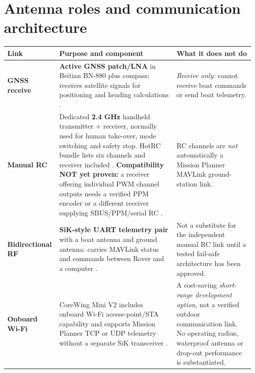 \section{Antenna roles and communication architecture}
\begin{tabularx}{\linewidth}{L{29mm}Y Y}
\toprule \textbf{Link} & \textbf{Purpose and component} & \textbf{What it does not do}\\\midrule
\textbf{GNSS receive} & \textbf{Active GNSS patch/LNA} in Beitian BN-880 plus compass; receives satellite signals for positioning and heading calculations \cite{bnShop,bnMaker,bnData}. & \emph{Receive only:} cannot receive boat commands or send boat telemetry.\\
\textbf{Manual RC} & Dedicated \textbf{2.4 GHz} handheld transmitter + receiver, normally used for human take-over, mode switching and safety stop. HotRC bundle lists six channels and receiver included \cite{hotrcCurrent,rcDoc}. \textbf{Compatibility NOT yet proven:} a receiver offering individual PWM channel outputs needs a verified PPM encoder or a different receiver supplying SBUS/PPM/serial RC \cite{coreDoc,rcPWMEncoder}. & RC channels are \emph{not} automatically a Mission Planner MAVLink ground-station link.\\
\textbf{Bidirectional RF} & \textbf{SiK-style UART telemetry pair} with a boat antenna and ground antenna: carries MAVLink status and commands between Rover and a computer \cite{radioDoc,radioConfig,radioShop}. & Not a substitute for the independent manual RC link until a tested fail-safe architecture has been approved.\\
\textbf{Onboard Wi-Fi} & CoreWing Mini V2 includes onboard Wi-Fi access-point/STA capability and supports Mission Planner TCP or UDP telemetry without a separate SiK transceiver \cite{coreDoc}. & A cost-saving \emph{short-range development option}, not a verified outdoor communication link. No operating radius, waterproof antenna or drop-out performance is substantiated.\\
\bottomrule
\end{tabularx}

